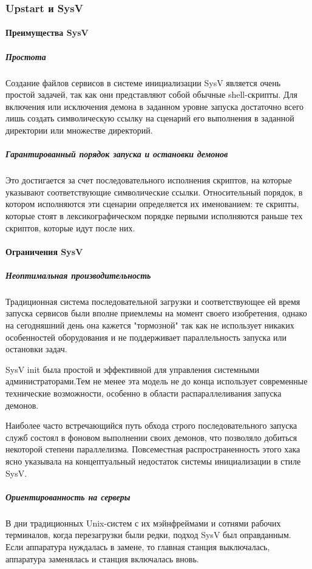 \subsubsection{Upstart и SysV}
\paragraph{Преимущества SysV}
\subparagraph{Простота}
Создание файлов сервисов в системе инициализации SysV является очень простой задачей, так как они представляют собой обычные shell-скрипты. Для включения или исключения демона в заданном уровне запуска достаточно всего лишь создать символическую ссылку на сценарий его выполнения в заданной директории или множестве директорий.
\subparagraph{Гарантированный порядок запуска и остановки демонов}
Это достигается за счет последовательного исполнения скриптов, на которые указывают соответствующие символические ссылки. Относительный порядок, в котором исполняются эти сценарии определяется их именованием: те скрипты, которые стоят в лексикографическом порядке первыми исполняются раньше тех скриптов, которые идут после них.
\paragraph{Ограничения SysV}
\subparagraph{Неоптимальная производительность}
Традиционная система последовательной загрузки и соответствующее ей время запуска сервисов были вполне приемлемы на момент своего изобретения, однако на сегодняшний день она кажется "тормозной" так как не использует никаких особенностей оборудования и не поддерживает параллельность запуска или остановки задач.

SysV init была простой и эффективной для управления системными администраторами.Тем не менее эта модель не до конца использует современные технические возможности, особенно в области распараллеливания запуска демонов.

Наиболее часто встречающийся путь обхода строго последовательного запуска служб состоял в фоновом выполнении своих демонов, что позволяло добиться некоторой степени параллелизма. Повсеместная распространенность этого хака ясно указывала на концептуальный недостаток системы инициализации в стиле SysV.  
\subparagraph{Ориентированность на серверы}
В дни традиционных Unix-систем с их мэйнфреймами и сотнями рабочих терминалов, когда перезагрузки были редки, подход SysV был оправданным. Если аппаратура нуждалась в замене, то главная станция выключалась, аппаратура заменялась и станция включалась вновь. 

